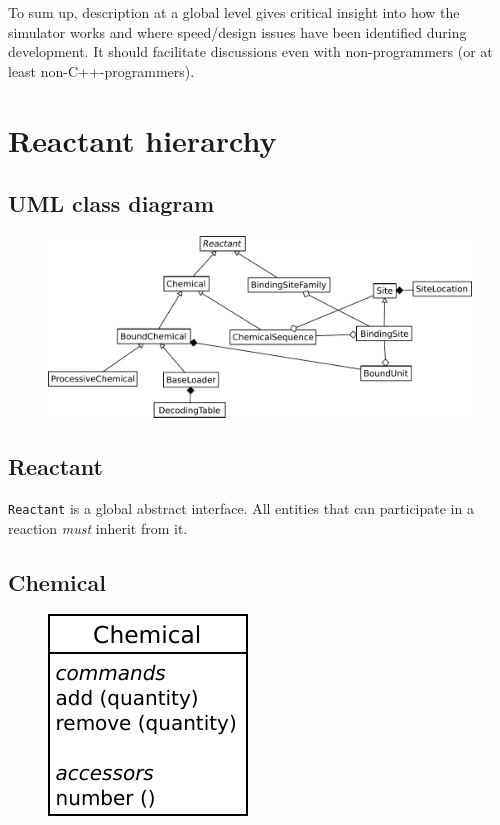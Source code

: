 \documentclass[12pt]{article}
\theoremstyle{definition}
\theoremstyle{remark}
\numberwithin{equation}{section}
\begin{document}
To sum up, description at a global level gives critical insight into how the simulator works and where speed/design issues have been identified during development. It should facilitate discussions even with non-programmers (or at least non-C++-programmers).

\section{Reactant hierarchy}

\subsection{UML class diagram}

\begin{figure}[!ht]
	\centering
	\includegraphics[width=0.8\linewidth]{reactant_uml}
\end{figure}

\subsection{Reactant}

\texttt{Reactant} is a global abstract interface. All entities that can participate in a reaction \emph{must} inherit from it.

\subsection{Chemical}

\begin{figure}[!ht]
	\centering
	\includegraphics[scale=0.8]{chemical}
\end{figure}
\end{document}
